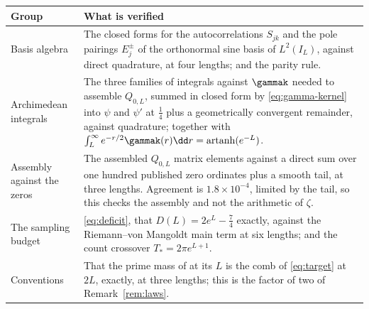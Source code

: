 \begin{center}
\begin{tabular}{@{}p{}p{}@{}}
\toprule
Group & What is verified\\
\midrule
Basis algebra &
The closed forms for the autocorrelations $S_{jk}$ and the pole pairings
$E_j^{\pm}$ of the orthonormal sine basis of $L^2(I_L)$, against direct
quadrature, at four lengths; and the parity rule.\\
Archimedean integrals &
The three families of integrals against $\gammak$ needed to assemble $Q_{0,L}$,
summed in closed form by \eqref{eq:gamma-kernel} into $\psi$ and $\psi'$ at
$\frac14$ plus a geometrically convergent remainder, against quadrature; together
with $\int_L^\infty e^{-r/2}\gammak(r)\dd r=\operatorname{artanh}(e^{-L})$.\\
Assembly against the zeros &
The assembled $Q_{0,L}$ matrix elements against a direct sum over one hundred
published zero ordinates plus a smooth tail, at three lengths. Agreement is
$1.8\times10^{-4}$, limited by the tail, so this checks the assembly and not the
arithmetic of $\zeta$.\\
The sampling budget &
\eqref{eq:deficit}, that $D(L)=2e^L-\frac74$ exactly, against the
Riemann--von Mangoldt main term at six lengths; and the count crossover
$T_*=2\pi e^{L+1}$.\\
Conventions &
That the prime mass of \cite{ZhuCompact} at its $L$ is the comb of
\eqref{eq:target} at $2L$, exactly, at three lengths; this is the factor of two
of Remark~\ref{rem:laws}.\\
\bottomrule
\end{tabular}
\end{center}


